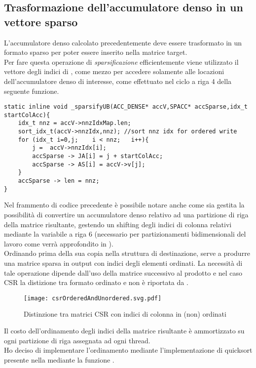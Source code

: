 \subsection{Trasformazione dell'accumulatore denso in un vettore sparso}	\label{chSpMMNum:sparsify}
L'accumulatore denso calcolato precedentemente deve essere trasformato in un formato sparso per poter essere 
inserito nella matrice target.\\
Per fare questa operazione di \emph{sparsificazione} efficientemente viene utilizzato il vettore degli indici di ,
come mezzo per accedere solamente alle locazioni dell'accumulatore denso  di interesse,
come effettuato nel ciclo a riga 4 della seguente funzione.\\
\begin{lstlisting}
static inline void _sparsifyUB(ACC_DENSE* accV,SPACC* accSparse,idx_t startColAcc){
    idx_t nnz = accV->nnzIdxMap.len;
    sort_idx_t(accV->nnzIdx,nnz); //sort nnz idx for ordered write
    for (idx_t i=0,j;    i < nnz;   i++){
        j =  accV->nnzIdx[i];
        accSparse -> JA[i] = j + startColAcc;
        accSparse -> AS[i] = accV->v[j];
    }
    accSparse -> len = nnz;
}
\end{lstlisting}
Nel frammento di codice precedente è possibile notare anche come sia gestita 
la possibilità di convertire un accumulatore denso relativo ad una partizione di riga della matrice risultante, 
gestendo un shifting degli indici di colonna \nnz relativi mediante la variabile  a riga 6
(necessario per partizionamenti bidimensionali del lavoro come verrà approfondito in  ).\\
Ordinando  prima della sua copia nella struttura di destinazione, 
serve a produrre una matrice sparsa in output con indici degli elementi \nnz ordinati.
La necessità di tale operazione dipende dall'uso della matrice successivo al prodotto 
e nel caso CSR la distizione tra formato ordinato e non è riportata da \cite{adaptiveTilingSpMM}.\\
\begin{figure}[H]
  \centering \texttt{[image: csrOrderedAndUnordered.svg.pdf]}
  \caption[rappresentazione CSR (non) ordinata]
  {Distinzione tra matrici CSR con indici di colonna in  (non) ordinati}
  \decoRule \label{fig:layeredGraphInnerProduct}
\end{figure}
Il costo dell'ordinamento degli indici della matrice risultante è ammortizzato su ogni partizione di riga assegnata ad ogni thread.\\
Ho deciso di implementare l'ordinamento mediante l'implementazione di quicksort
presente nella  mediante la funzione .\\


